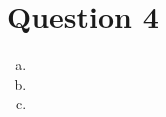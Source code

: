 \documentclass[letterpaper,12pt,oneside,final]{book}
\begin{document}
\newpage
\section*{Question 4}


\begin{enumerate}[a)]

\item %


\item %


\item %


\end{enumerate}
\end{document}
